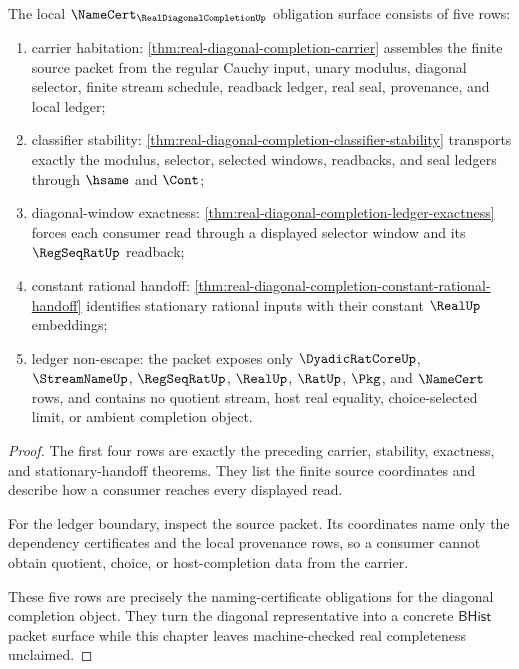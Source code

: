 \begin{theorem}
\label{thm:real-diagonal-completion-namecert-obligation-surface}
The local $\NameCert_{\RealDiagonalCompletionUp}$ obligation surface consists of five rows:
\begin{enumerate}
\item carrier habitation: \autoref{thm:real-diagonal-completion-carrier} assembles the finite source packet from the regular Cauchy input, unary modulus, diagonal selector, finite stream schedule, readback ledger, real seal, provenance, and local ledger;
\item classifier stability: \autoref{thm:real-diagonal-completion-classifier-stability} transports exactly the modulus, selector, selected windows, readbacks, and seal ledgers through $\hsame$ and $\Cont$;
\item diagonal-window exactness: \autoref{thm:real-diagonal-completion-ledger-exactness} forces each consumer read through a displayed selector window and its $\RegSeqRatUp$ readback;
\item constant rational handoff: \autoref{thm:real-diagonal-completion-constant-rational-handoff} identifies stationary rational inputs with their constant $\RealUp$ embeddings;
\item ledger non-escape: the packet exposes only $\DyadicRatCoreUp$, $\StreamNameUp$, $\RegSeqRatUp$, $\RealUp$, $\RatUp$, $\Pkg$, and $\NameCert$ rows, and contains no quotient stream, host real equality, choice-selected limit, or ambient completion object.
\end{enumerate}
\end{theorem}
\begin{proof}
The first four rows are exactly the preceding carrier, stability, exactness, and stationary-handoff theorems. They list the finite source coordinates and describe how a consumer reaches every displayed read.

For the ledger boundary, inspect the source packet. Its coordinates name only the dependency certificates and the local provenance rows, so a consumer cannot obtain quotient, choice, or host-completion data from the carrier.

These five rows are precisely the naming-certificate obligations for the diagonal completion object. They turn the diagonal representative into a concrete $\mathsf{BHist}$ packet surface while this chapter leaves machine-checked real completeness unclaimed.
\end{proof}

